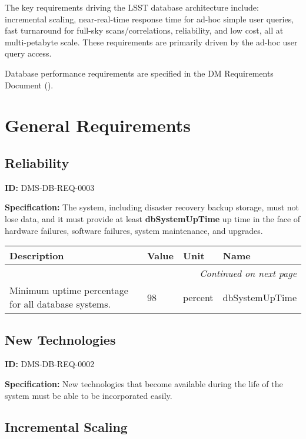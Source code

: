 \documentclass[toc]{lsstdoc}
\date{2017-06-30}
\makeatletter
\newcommand{\paramname}[1]{\hspace{0pt}#1}
\newcommand{\unitname}[1]{\hspace{0pt}#1}
\newenvironment{parameters}[0]{%
\setlength\LTleft{0pt}
\setlength\LTright{\fill}
\begin{small}
\begin{longtable}[]{|p{0.49\textwidth}|l|p{0.6in}|p{1.70in}@{}|}

\hline \textbf{Description} & \textbf{Value} & \textbf{Unit} & \textbf{Name} \\ \hline
\endhead

\hline \multicolumn{4}{r}{\emph{Continued on next page}} \\
\endfoot

\hline\hline
\endlastfoot
}{%
\hline
\end{longtable}
\end{small}
}
\makeatother
\begin{document}
\maketitle

The key requirements driving the LSST database architecture include: incremental scaling, near-real-time response time for ad-hoc simple user queries, fast turnaround for full-sky scans/correlations, reliability, and low cost, all at multi-petabyte scale. These requirements are primarily driven by the ad-hoc user query access.

Database performance requirements are specified in the DM Requirements Document ().

\section{General Requirements}

\subsection{Reliability}

\label{DMS-DB-REQ-0003}
\textbf{ID:} DMS-DB-REQ-0003

\textbf{Specification:}
The system, including disaster recovery backup storage, must not lose data, and it must provide at least \textbf{dbSystemUpTime} up time in the face of hardware failures, software failures, system maintenance, and upgrades.

\begin{parameters}
Minimum uptime percentage for all database systems.
&
98
&
\unitname{%
percent
}
&
\paramname{%
dbSystemUpTime
} \\\hline
\end{parameters}

\subsection{New Technologies}

\label{DMS-DB-REQ-0002}
\textbf{ID:} DMS-DB-REQ-0002

\textbf{Specification:}
New technologies that become available during the life of the system must be able to be incorporated easily.

\subsection{Incremental Scaling}
\end{document}
